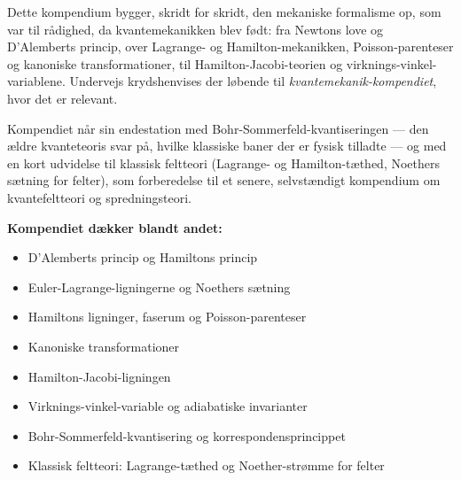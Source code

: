 \documentclass[11pt]{book}
\begin{document}
\vspace{1.4cm}

\begin{minipage}{0.82\textwidth}
\small
Dette kompendium bygger, skridt for skridt, den mekaniske formalisme
op, som var til rådighed, da kvantemekanikken blev født: fra Newtons
love og D'Alemberts princip, over Lagrange- og Hamilton-mekanikken,
Poisson-parenteser og kanoniske transformationer, til
Hamilton-Jacobi-teorien og virknings-vinkel-variablene. Undervejs
krydshenvises der løbende til \emph{kvantemekanik-kompendiet}, hvor
det er relevant.

Kompendiet når sin endestation med Bohr-Sommerfeld-kvantiseringen —
den ældre kvanteteoris svar på, hvilke klassiske baner der er
fysisk tilladte — og med en kort udvidelse til klassisk feltteori
(Lagrange- og Hamilton-tæthed, Noethers sætning for felter), som
forberedelse til et senere, selvstændigt kompendium om
kvantefeltteori og spredningsteori.
\end{minipage}

\vspace{1.2cm}

\begin{minipage}{0.7\textwidth}
\small
\textbf{Kompendiet dækker blandt andet:}
\begin{itemize}
  \setlength{\itemsep}{0.15em}
  \item D'Alemberts princip og Hamiltons princip
  \item Euler-Lagrange-ligningerne og Noethers sætning
  \item Hamiltons ligninger, faserum og Poisson-parenteser
  \item Kanoniske transformationer
  \item Hamilton-Jacobi-ligningen
  \item Virknings-vinkel-variable og adiabatiske invarianter
  \item Bohr-Sommerfeld-kvantisering og korrespondensprincippet
  \item Klassisk feltteori: Lagrange-tæthed og Noether-strømme for felter
\end{itemize}
\end{minipage}

\vfill

\endgroup
\clearpage
\end{document}
